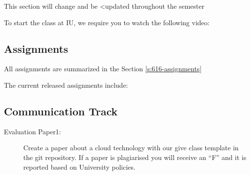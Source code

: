 \begin{WARNING}
This section will change and be <updated throughout the semester
\end{WARNING}

\begin{IU}

To start the class at IU, we require you to watch the following video:



\end{IU}

\subsection{Assignments}

All assignments are summarized in the Section \ref{s:616-assignments}

The current released assignments include:


\subsection{Communication Track}




\begin{description}
\item[Evaluation Paper1:] Create a paper about a cloud technology with
  our give class template in the git repository. If a paper is
  plagiarised you will receive an ``F'' and it is reported based on
  University policies.
\end{description}


